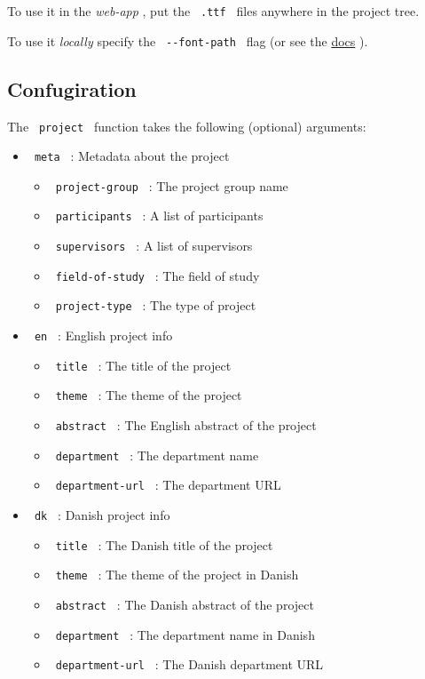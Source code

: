 To use it in the \emph{web-app} , put the \texttt{\ .ttf\ } files
anywhere in the project tree.

To use it \emph{locally} specify the \texttt{\ -\/-font-path\ } flag (or
see the
\href{https://typst.app/docs/reference/text/text/\#parameters-font}{docs}
).

\subsection{Confugiration}\label{confugiration}

The \texttt{\ project\ } function takes the following (optional)
arguments:

\begin{itemize}
\item
  \texttt{\ meta\ } : Metadata about the project

  \begin{itemize}
  \tightlist
  \item
    \texttt{\ project-group\ } : The project group name
  \item
    \texttt{\ participants\ } : A list of participants
  \item
    \texttt{\ supervisors\ } : A list of supervisors
  \item
    \texttt{\ field-of-study\ } : The field of study
  \item
    \texttt{\ project-type\ } : The type of project
  \end{itemize}
\item
  \texttt{\ en\ } : English project info

  \begin{itemize}
  \tightlist
  \item
    \texttt{\ title\ } : The title of the project
  \item
    \texttt{\ theme\ } : The theme of the project
  \item
    \texttt{\ abstract\ } : The English abstract of the project
  \item
    \texttt{\ department\ } : The department name
  \item
    \texttt{\ department-url\ } : The department URL
  \end{itemize}
\item
  \texttt{\ dk\ } : Danish project info

  \begin{itemize}
  \tightlist
  \item
    \texttt{\ title\ } : The Danish title of the project
  \item
    \texttt{\ theme\ } : The theme of the project in Danish
  \item
    \texttt{\ abstract\ } : The Danish abstract of the project
  \item
    \texttt{\ department\ } : The department name in Danish
  \item
    \texttt{\ department-url\ } : The Danish department URL
  \end{itemize}
\end{itemize}

